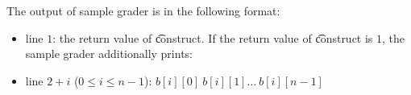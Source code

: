 The output of sample grader is in the following format:
\begin{itemize}
\item line $1$: the return value of \t{construct}.
If the return value of \t{construct} is $1$, the sample grader additionally prints:
\item line $2 + i$ ($0 \leq i \leq n - 1$): $b[i][0]\ b[i][1]\ldots \ b[i][n-1]$
\end{itemize}